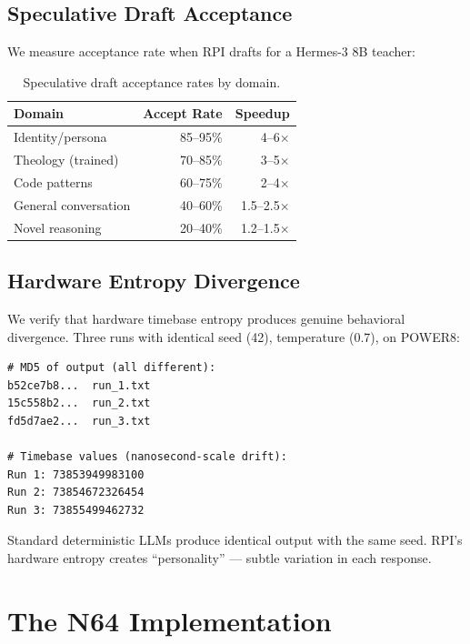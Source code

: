 \documentclass[10pt,twocolumn]{article}
\begin{document}
\subsection{Speculative Draft Acceptance}

We measure acceptance rate when RPI drafts for a Hermes-3 8B teacher:

\begin{table}[h]
\centering
\small
\begin{tabular}{lrr}
\toprule
\textbf{Domain} & \textbf{Accept Rate} & \textbf{Speedup} \\
\midrule
Identity/persona & 85--95\% & 4--6$\times$ \\
Theology (trained) & 70--85\% & 3--5$\times$ \\
Code patterns & 60--75\% & 2--4$\times$ \\
General conversation & 40--60\% & 1.5--2.5$\times$ \\
Novel reasoning & 20--40\% & 1.2--1.5$\times$ \\
\bottomrule
\end{tabular}
\caption{Speculative draft acceptance rates by domain.}
\label{tab:acceptance}
\end{table}

\subsection{Hardware Entropy Divergence}

We verify that hardware timebase entropy produces genuine behavioral divergence. Three runs with identical seed (42), temperature (0.7), on POWER8:

\begin{lstlisting}
# MD5 of output (all different):
b52ce7b8...  run_1.txt
15c558b2...  run_2.txt
fd5d7ae2...  run_3.txt

# Timebase values (nanosecond-scale drift):
Run 1: 73853949983100
Run 2: 73854672326454
Run 3: 73855499462732
\end{lstlisting}

Standard deterministic LLMs produce identical output with the same seed. RPI's hardware entropy creates ``personality'' --- subtle variation in each response.

\section{The N64 Implementation}
\label{sec:n64}
\end{document}
